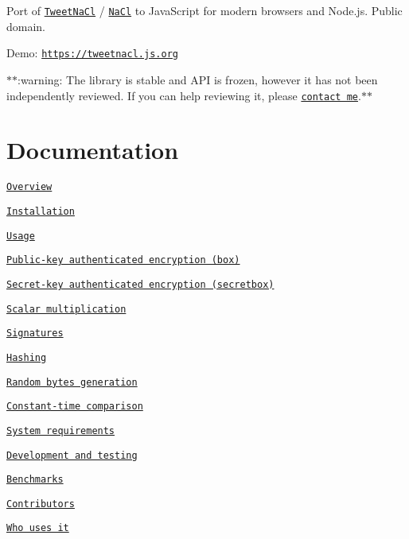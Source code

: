 Port of \href{http://tweetnacl.cr.yp.to}{\tt Tweet\+Na\+Cl} / \href{http://nacl.cr.yp.to/}{\tt Na\+Cl} to Java\+Script for modern browsers and Node.\+js. Public domain.

\href{https://travis-ci.org/dchest/tweetnacl-js}{\tt }

Demo\+: \href{https://tweetnacl.js.org}{\tt https\+://tweetnacl.\+js.\+org}

$\ast$$\ast$\+:warning\+: The library is stable and A\+PI is frozen, however it has not been independently reviewed. If you can help reviewing it, please \href{mailto:dmitry@codingrobots.com}{\tt contact me}.$\ast$$\ast$

\section*{Documentation }


\begin{DoxyItemize}
\item \href{#overview}{\tt Overview}
\item \href{#installation}{\tt Installation}
\item \href{#usage}{\tt Usage}
\begin{DoxyItemize}
\item \href{#public-key-authenticated-encryption-box}{\tt Public-\/key authenticated encryption (box)}
\item \href{#secret-key-authenticated-encryption-secretbox}{\tt Secret-\/key authenticated encryption (secretbox)}
\item \href{#scalar-multiplication}{\tt Scalar multiplication}
\item \href{#signatures}{\tt Signatures}
\item \href{#hashing}{\tt Hashing}
\item \href{#random-bytes-generation}{\tt Random bytes generation}
\item \href{#constant-time-comparison}{\tt Constant-\/time comparison}
\end{DoxyItemize}
\item \href{#system-requirements}{\tt System requirements}
\item \href{#development-and-testing}{\tt Development and testing}
\item \href{#benchmarks}{\tt Benchmarks}
\item \href{#contributors}{\tt Contributors}
\item \href{#who-uses-it}{\tt Who uses it}
\end{DoxyItemize}

